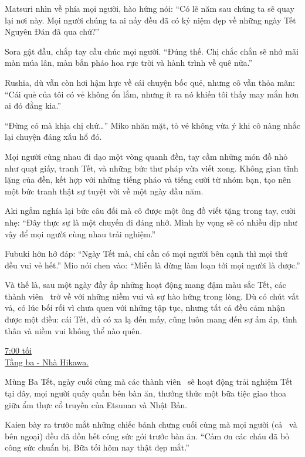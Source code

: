 \documentclass[../main.tex]{subfiles}
\begin{document}
Matsuri nhìn về phía mọi người, hào hứng nói: ``Có lẽ năm sau chúng ta sẽ quay lại nơi này. Mọi người chúng ta ai nấy đều đã có kỷ niệm đẹp về những ngày Tết Nguyên Đán đã qua chứ?''

Sora gật đầu, chắp tay cầu chúc mọi người. ``Đúng thế. Chị chắc chắn sẽ nhớ mãi màn múa lân, màn bắn pháo hoa rực trời và hành trình về quê nữa.''

Rushia, dù vẫn còn hơi hậm hực về cái chuyện bốc quẻ, nhưng cô vẫn thỏa mãn: ``Cái quẻ của tôi có vẻ không ổn lắm, nhưng ít ra nó khiến tôi thấy may mắn hơn ai đó đằng kia.''

``Đừng có mà khịa chị chứ\dots'' Miko nhăn mặt, tỏ vẻ không vừa ý khi cô nàng nhắc lại chuyện đáng xấu hổ đó.

Mọi người cùng nhau đi dạo một vòng quanh đền, tay cầm những món đồ nhỏ như quạt giấy, tranh Tết, và những bức thư pháp vừa viết xong. Không gian tĩnh lặng của đền, kết hợp với những tiếng pháo và tiếng cười từ nhóm bạn, tạo nên một bức tranh thật sự tuyệt vời về một ngày đầu năm.

Aki ngắm nghía lại bức câu đối mà cô được một ông đồ viết tặng trong tay, cười nhẹ: ``Đây thực sự là một chuyến đi đáng nhớ. Mình hy vọng sẽ có nhiều dịp như vậy để mọi người cùng nhau trải nghiệm.''

Fubuki hớn hở đáp: ``Ngày Tết mà, chỉ cần có mọi người bên cạnh thì mọi thứ đều vui vẻ hết.'' Mio nói chen vào: ``Miễn là đừng làm loạn tới mọi người là được.''

Và thế là, sau một ngày đầy ắp những hoạt động mang đậm màu sắc Tết, các thành viên \hll\ trở về với những niềm vui và sự hào hứng trong lòng. Dù có chút vất vả, có lúc bối rối vì chưa quen với những tập tục, nhưng tất cả đều cảm nhận được một điều: cái Tết, dù có xa lạ đến mấy, cũng luôn mang đến sự ấm áp, tình thân và niềm vui không thể nào quên.

\ct

\begin{center}
    \uline{7:00 tối\\Tầng ba - Nhà Hikawa.}
\end{center}

Mùng Ba Tết, ngày cuối cùng mà các thành viên \hll\ sẽ hoạt động trải nghiệm Tết tại đây, mọi người quây quần bên bàn ăn, thưởng thức một bữa tiệc giao thoa giữa ẩm thực cổ truyền của Etsunan và Nhật Bản.

Kaien bày ra trước mắt những chiếc bánh chưng cuối cùng mà mọi người (cả \hll\ và bên ngoại) đều đã dồn hết công sức gói trước bàn ăn. ``Cảm ơn các cháu đã bỏ công sức chuẩn bị. Bữa tối hôm nay thật đẹp mắt.''
\end{document}
